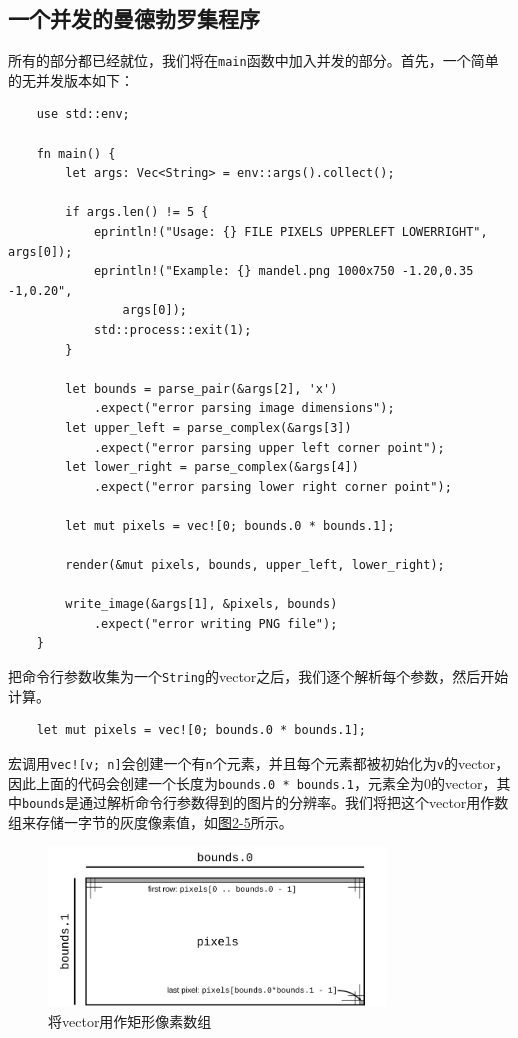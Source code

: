 \subsection{一个并发的曼德勃罗集程序}\label{mandelbrot}
所有的部分都已经就位，我们将在\texttt{main}函数中加入并发的部分。首先，一个简单的无并发版本如下：
\begin{verbatim}
    use std::env;

    fn main() {
        let args: Vec<String> = env::args().collect();

        if args.len() != 5 {
            eprintln!("Usage: {} FILE PIXELS UPPERLEFT LOWERRIGHT",     args[0]);
            eprintln!("Example: {} mandel.png 1000x750 -1.20,0.35   -1,0.20",
                args[0]);
            std::process::exit(1);
        }

        let bounds = parse_pair(&args[2], 'x')
            .expect("error parsing image dimensions");
        let upper_left = parse_complex(&args[3])
            .expect("error parsing upper left corner point");
        let lower_right = parse_complex(&args[4])
            .expect("error parsing lower right corner point");

        let mut pixels = vec![0; bounds.0 * bounds.1];

        render(&mut pixels, bounds, upper_left, lower_right);

        write_image(&args[1], &pixels, bounds)
            .expect("error writing PNG file");
    }
\end{verbatim}

把命令行参数收集为一个\texttt{String}的vector之后，我们逐个解析每个参数，然后开始计算。

\begin{verbatim}
    let mut pixels = vec![0; bounds.0 * bounds.1];
\end{verbatim}

宏调用\texttt{vec![v; n]}会创建一个有\texttt{n}个元素，并且每个元素都被初始化为\texttt{v}的vector，因此上面的代码会创建一个长度为\texttt{bounds.0 * bounds.1}，元素全为0的vector，其中\texttt{bounds}是通过解析命令行参数得到的图片的分辨率。我们将把这个vector用作数组来存储一字节的灰度像素值，如\hyperref[f2-5]{图2-5}所示。

\begin{figure}[htbp]
    \centering
    \includegraphics[width=0.8\textwidth]{../img/f2-5.png}
    \caption{将vector用作矩形像素数组}
    \label{f2-5}
\end{figure}

